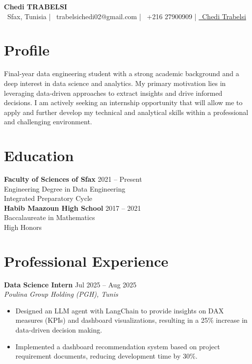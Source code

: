 \documentclass[9pt]{article}
\begin{document}
\begin{center}
    {\Large \textbf{Chedi TRABELSI}}\\[0.3em]
    \faMapMarker\ Sfax, Tunisia | \quad
    \faEnvelope~trabelsichedi02@gmail.com \quad | \quad 
    \faPhone*~+216 27900909 \quad |
    \href{https://www.linkedin.com/in/cheditrabelsi}{\raisebox{-0.05\height} \faLinkedin\ Chedi Trabelsi}
\end{center}
\vspace{0.2em}

\section*{Profile}
Final-year data engineering student with a strong academic background and a deep interest in data science and analytics. My primary motivation lies in leveraging data-driven approaches to extract insights and drive informed decisions. I am actively seeking an internship opportunity that will allow me to apply and further develop my technical and analytical skills within a professional and challenging environment.

\section*{Education}
\textbf{Faculty of Sciences of Sfax} \hfill 2021 -- Present \\
Engineering Degree in Data Engineering \\
Integrated Preparatory Cycle \\
\textbf{Habib Maazoun High School} \hfill 2017 -- 2021 \\
Baccalaureate in Mathematics \\
High Honors

\section*{Professional Experience}
\textbf{Data Science Intern} \hfill Jul 2025 -- Aug 2025 \\
\textit{\small Poulina Group Holding (PGH), Tunis} \vspace{-2mm}
\begin{itemize}[itemsep=-0.2em] 
    \item Designed an LLM agent with LangChain to provide insights on DAX measures (KPIs) and dashboard visualizations, resulting in a 25\% increase in data-driven decision making.
    \item Implemented a dashboard recommendation system based on project requirement documents, reducing development time by 30\%.
\end{itemize}
\vspace{1mm}
\end{document}
